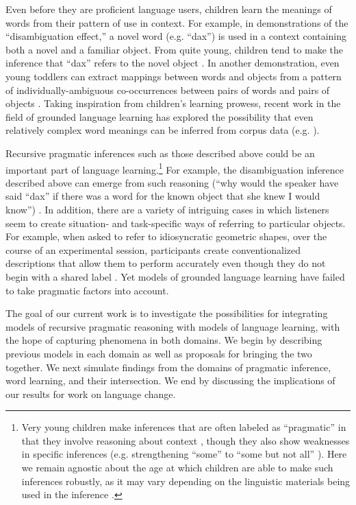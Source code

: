 \documentclass{article} %
\begin{document}
Even before they are proficient language users, children learn the meanings of words from their pattern of use in context. For example, in demonstrations of the ``disambiguation effect,'' a novel word (e.g. ``dax'') is used in a context containing both a novel and a familiar object. From quite young, children tend to make the inference that ``dax'' refers to the novel object \cite{markman1988}. In another demonstration, even young toddlers can extract mappings between words and objects from a pattern of individually-ambiguous co-occurrences between pairs of words and pairs of objects \cite{smith2008}. Taking inspiration from children's learning prowess, recent work in the field of grounded language learning has explored the possibility that even relatively complex word meanings can be inferred from corpus data (e.g. \cite{zettlemoyer2005,chen2008,frank2009,kwiatkowski2010,johnson2012}).

Recursive pragmatic inferences such as those described above could be an important part of language learning.\footnote{Very young children make inferences that are often labeled as ``pragmatic'' in that they involve reasoning about context \cite{clark1988,baldwin1993}, though they also show weaknesses in specific inferences (e.g. strengthening ``some'' to ``some but not all'' \cite{papafragou2003}). Here we remain agnostic about the age at which children are able to make such inferences robustly, as it may vary depending on the linguistic materials being used in the inference \cite{barner2011}.} For example, the disambiguation inference described above can emerge from such reasoning (``why would the speaker have said ``dax'' if there was a word for the known object that she knew I would know'') \cite{clark1988}. In addition, there are a variety of intriguing cases in which listeners seem to create situation- and task-specific ways of referring to particular objects. For example, when asked to refer to idiosyncratic geometric shapes, over the course of an experimental session, participants create conventionalized descriptions that allow them to perform accurately even though they do not begin with a shared label \cite{krauss1964,clark1986}. Yet models of grounded language learning have failed to take pragmatic factors into account.

The goal of our current work is to investigate the possibilities for integrating models of recursive pragmatic reasoning with models of language learning, with the hope of capturing phenomena in both domains. We begin by describing previous models in each domain as well as proposals for bringing the two together. We next simulate findings from the domains of pragmatic inference, word learning, and their intersection. We end by discussing the implications of our results for work on language change.
\end{document}
